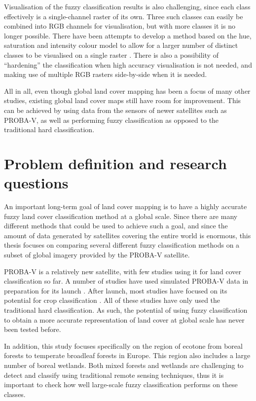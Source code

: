 \documentclass[a4paper,10pt]{book}
\begin{document}
Visualisation of the fuzzy classification results is also challenging, since each class effectively is a single-channel raster of its own. Three such classes can easily be combined into RGB channels for visualisation, but with more classes it is no longer possible. There have been attempts to develop a method based on the hue, saturation and intensity colour model to allow for a larger number of distinct classes to be visualised on a single raster \citep{hengl2004fuzzycmeans}. There is also a possibility of ``hardening'' the classification when high accuracy visualisation is not needed, and making use of multiple RGB rasters side-by-side when it is needed.

All in all, even though global land cover mapping has been a focus of many other studies, existing global land cover maps still have room for improvement. This can be achieved by using data from the sensors of newer satellites such as PROBA-V, as well as performing fuzzy classification as opposed to the traditional hard classification.

\chapter{Problem definition and research questions}

An important long-term goal of land cover mapping is to have a highly accurate fuzzy land cover classification method at a global scale. Since there are many different methods that could be used to achieve such a goal, and since the amount of data generated by satellites covering the entire world is enormous, this thesis focuses on comparing several different fuzzy classification methods on a subset of global imagery provided by the PROBA-V satellite.

PROBA-V is a relatively new satellite, with few studies using it for land cover classification so far. A number of studies have used simulated PROBA-V data in preparation for its launch \citep{stathakis2014probavurban,roumenina2013probavcrops,bartalev2014probavboreal}. After launch, most studies have focused on its potential for crop classification \citep{roumenina2015probavcrops,durgun2016crop,lambert2016cropland}. All of these studies have only used the traditional hard classification. As such, the potential of using fuzzy classification to obtain a more accurate representation of land cover at global scale has never been tested before.

In addition, this study focuses specifically on the region of ecotone from boreal forests to temperate broadleaf forests in Europe. This region also includes a large number of boreal wetlands. Both mixed forests and wetlands are challenging to detect and classify using traditional remote sensing techniques, thus it is important to check how well large-scale fuzzy classification performs on these classes.
\end{document}
